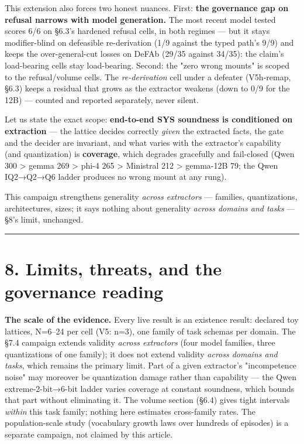 \documentclass[11pt]{article}
\begin{document}
This extension also forces two honest nuances. First: \textbf{the governance gap on refusal narrows with model generation.} The most recent model tested scores 6/6 on §6.3's hardened refusal cells, in both regimes — but it stays modifier-blind on defeasible re-derivation (1/9 against the typed path's 9/9) and keeps the over-general-cut losses on DeFAb (29/35 against 34/35): the claim's load-bearing cells stay load-bearing. Second: the "zero wrong mounts" is scoped to the refusal/volume cells. The \emph{re-derivation} cell under a defeater (V5h-remap, §6.3) keeps a residual that grows as the extractor weakens (down to 0/9 for the 12B) — counted and reported separately, never silent.

Let us state the exact scope: \textbf{end-to-end SYS soundness is conditioned on extraction} — the lattice decides correctly \emph{given} the extracted facts, the gate and the decider are invariant, and what varies with the extractor's capability (and quantization) is \textbf{coverage}, which degrades gracefully and fail-closed (Qwen 300 > gemma 269 > phi-4 265 > Ministral 212 > gemma-12B 79; the Qwen IQ2→Q2→Q6 ladder produces no wrong mount at any rung).

This campaign strengthens generality \emph{across extractors} — families, quantizations, architectures, sizes; it says nothing about generality \emph{across domains and tasks} — §8's limit, unchanged.

\medskip\hrule\medskip

\section*{8. Limits, threats, and the governance reading}

\textbf{The scale of the evidence.} Every live result is an existence result: declared toy lattices, N=6–24 per cell (V5: n=3), one family of task schemas per domain. The §7.4 campaign extends validity \emph{across extractors} (four model families, three quantizations of one family); it does not extend validity \emph{across domains and tasks}, which remains the primary limit. Part of a given extractor's "incompetence noise" may moreover be quantization damage rather than capability — the Qwen extreme-2-bit→6-bit ladder varies coverage at constant soundness, which bounds that part without eliminating it. The volume section (§6.4) gives tight intervals \emph{within} this task family; nothing here estimates cross-family rates. The population-scale study (vocabulary growth laws over hundreds of episodes) is a separate campaign, not claimed by this article.
\end{document}
